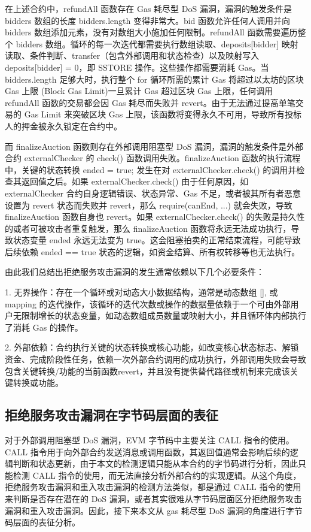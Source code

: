 \documentclass[print, master, vlined, timesmath]{DissertUESTC}
\begin{document}
在上述合约中，refundAll 函数存在 Gas 耗尽型 DoS 漏洞，漏洞的触发条件是 bidders 数组的长度 bidders.length 变得非常大。bid 函数允许任何人调用并向 bidders 数组添加元素，没有对数组大小施加任何限制。refundAll 函数需要遍历整个 bidders 数组。循环的每一次迭代都需要执行数组读取、deposits[bidder] 映射读取、条件判断、transfer（包含外部调用和状态检查）以及映射写入 deposits[bidder] = 0，即 SSTORE 操作。这些操作都需要消耗 Gas。当 bidders.length 足够大时，执行整个 for 循环所需的累计 Gas 将超过以太坊的区块 Gas 上限 (Block Gas Limit)一旦累计 Gas 超过区块 Gas 上限，任何调用 refundAll 函数的交易都会因 Gas 耗尽而失败并 revert。由于无法通过提高单笔交易的 Gas Limit 来突破区块 Gas 上限，该函数将变得永久不可用，导致所有投标人的押金被永久锁定在合约中。

而 finalizeAuction 函数则存在外部调用阻塞型 DoS 漏洞，漏洞的触发条件是外部合约 externalChecker 的 check() 函数调用失败。finalizeAuction 函数的执行流程中，关键的状态转换 ended = true; 发生在对 externalChecker.check() 的调用并检查其返回值之后。如果 externalChecker.check() 由于任何原因，如 externalChecker 合约自身逻辑错误、状态异常、Gas 不足，或者被其所有者恶意设置为 revert 状态而失败并 revert，那么 require(canEnd, ...) 就会失败，导致 finalizeAuction 函数自身也 revert。如果 externalChecker.check() 的失败是持久性的或者可被攻击者重复触发，那么 finalizeAuction 函数将永远无法成功执行，导致状态变量 ended 永远无法变为 true。这会阻塞拍卖的正常结束流程，可能导致后续依赖 ended == true 状态的逻辑，如资金结算、所有权转移等也无法执行。


由此我们总结出拒绝服务攻击漏洞的发生通常依赖以下几个必要条件：

1. 无界操作：存在一个循环或对动态大小数据结构，通常是动态数组 [], 或 mapping 的迭代操作，该循环的迭代次数或操作的数据量依赖于一个可由外部用户无限制增长的状态变量，如动态数组成员数量或映射大小，并且循环体内部执行了消耗 Gas 的操作。

2. 外部依赖：合约执行关键的状态转换或核心功能，如改变核心状态标志、解锁资金、完成阶段性任务，依赖一次外部合约调用的成功执行，外部调用失败会导致包含关键转换/功能的当前函数revert，并且没有提供替代路径或机制来完成该关键转换或功能。



\subsection{拒绝服务攻击漏洞在字节码层面的表征}


对于外部调用阻塞型 DoS 漏洞，EVM 字节码中主要关注 CALL 指令的使用。CALL 指令用于向外部合约发送消息或调用函数，其返回值通常会影响后续的逻辑判断和状态更新，由于本文的检测逻辑只能从本合约的字节码进行分析，因此只能检测 CALL 指令的使用，而无法直接分析外部合约的实现逻辑。从这个角度，拒绝服务攻击漏洞和重入攻击漏洞的检测方法类似，都是通过 CALL 指令的使用来判断是否存在潜在的 DoS 漏洞，或者其实很难从字节码层面区分拒绝服务攻击漏洞和重入攻击漏洞。因此，接下来本文从 gas 耗尽型 DoS 漏洞的角度进行字节码层面的表征分析。
\end{document}
